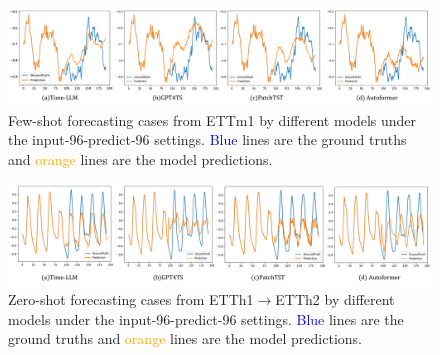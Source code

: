 \begin{figure}[!htbp]
\begin{center}
\centerline{\includegraphics[width=\columnwidth]{figures/visual_few.pdf}}
	\caption{Few-shot forecasting cases from ETTm1 by different models under the input-96-predict-96 settings. \textcolor{blue}{Blue} lines are the ground truths and \textcolor{orange}{orange} lines are the model predictions.}
	\label{fig:visual_ettm1}
\end{center}
\vspace{-20pt}
\end{figure}

\begin{figure}[!htbp]
\begin{center}
\centerline{\includegraphics[width=\columnwidth]{figures/visual_zero.pdf}}
	\caption{Zero-shot forecasting cases from ETTh1$\rightarrow$ETTh2 by different models under the input-96-predict-96 settings. \textcolor{blue}{Blue} lines are the ground truths and \textcolor{orange}{orange} lines are the model predictions.}
	\label{fig:visual_etth1_etth2}
\end{center}
\vspace{-20pt}
\end{figure}